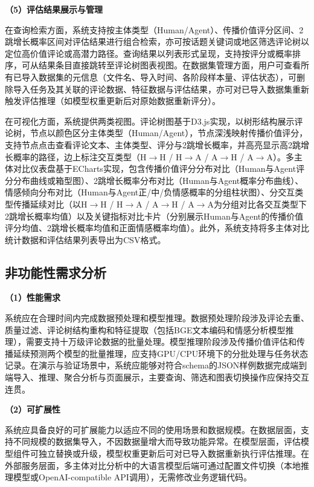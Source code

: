\textbf{（5）评估结果展示与管理}

在查询检索方面，系统支持按主体类型（Human/Agent）、传播价值评分区间、2跳增长概率区间对评估结果进行组合检索，亦可按话题关键词或地区筛选评论树以定位高价值评论或高潜力路径。查询结果以列表形式呈现，支持按评分或概率排序，可从结果条目直接跳转至评论树图表视图。在数据集管理方面，用户可查看所有已导入数据集的元信息（文件名、导入时间、各阶段样本量、评估状态），可删除导入任务及其关联的评论数据、特征数据与评估结果，亦可对已导入数据集重新触发评估推理（如模型权重更新后对原始数据重新评分）。

在可视化方面，系统提供两类视图。评论树图基于D3.js\cite{bostock2011d3}实现，以树形结构展示评论树，节点以颜色区分主体类型（Human/Agent），节点深浅映射传播价值评分，支持节点点击查看评论文本、主体类型、评分与2跳增长概率，并高亮显示高2跳增长概率的路径，边上标注交互类型（H$\to$H / H$\to$A / A$\to$H / A$\to$A）。多主体对比仪表盘基于ECharts实现，包含传播价值评分分布对比（Human与Agent评分分布曲线或箱型图）、2跳增长概率分布对比（Human与Agent概率分布曲线）、情感倾向分布对比（Human与Agent正/中/负情感概率的分组柱状图）、分交互类型传播延续对比（以H$\to$H / H$\to$A / A$\to$H / A$\to$A为分组对比各交互类型下2跳增长概率均值）以及关键指标对比卡片（分别展示Human与Agent的传播价值评分均值、2跳增长概率均值和正面情感概率均值）。此外，系统支持将多主体对比统计数据和评估结果列表导出为CSV格式。

\subsection{非功能性需求分析}

\textbf{（1）性能需求}

系统应在合理时间内完成数据预处理和模型推理。数据预处理阶段涉及评论去重、质量过滤、评论树结构重构和特征提取（包括BGE文本编码和情感分析模型推理），需要支持十万级评论数据的批量处理。模型推理阶段涉及传播价值评估和传播延续预测两个模型的批量推理，应支持GPU/CPU环境下的分批处理与任务状态记录。在演示与验证场景中，系统应能够对符合schema的JSON样例数据完成端到端导入、推理、聚合分析与页面展示，主要查询、筛选和图表切换操作应保持交互连贯。

\textbf{（2）可扩展性}

系统应具备良好的可扩展能力以适应不同的使用场景和数据规模。在数据层面，支持不同规模的数据集导入，不因数据量增大而导致功能异常。在模型层面，评估模型组件可独立替换或升级，模型权重更新后可对已导入数据重新执行评估推理。在外部服务层面，多主体对比分析中的大语言模型后端可通过配置文件切换（本地推理模型或OpenAI-compatible API调用），无需修改业务逻辑代码。

